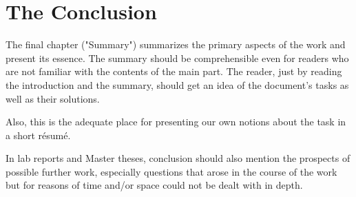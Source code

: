 \section{The Conclusion}

The final chapter ("Summary") summarizes the primary aspects of the work
and present its essence. The summary should be comprehensible even for readers who
are not familiar with the contents of the main part. The reader, just by reading the
introduction and the summary, should get an idea of the document's tasks as well as
their solutions.

Also, this is the adequate place for presenting our own notions about the task in a 
short résumé.

In lab reports and Master theses, conclusion should also mention the prospects
of possible further work, especially questions that arose in the course of the
work but for reasons of time and/or space could not be dealt with in depth.

